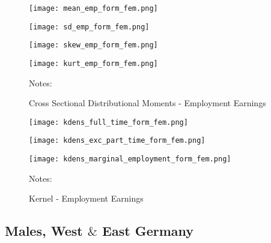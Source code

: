\documentclass[12pt, a4paper]{article}
\begin{document}
\begin{figure}[!h]
\captionsetup{font=large}
\caption{Cross Sectional Distributional Moments - Employment Earnings}
	\begin{minipage}[b]{0.48\textwidth} 
		\centering
		\texttt{[image: mean\_emp\_form\_fem.png]}
		\label{fig:mean_emp_form_fem}
	\end{minipage}
	\begin{minipage}[b]{0.48\textwidth}
		\centering
		\texttt{[image: sd\_emp\_form\_fem.png]}
		\label{fig:var_emp_form_fem}
	\end{minipage}
	\begin{minipage}[b]{0.48\textwidth} 
		\centering
		\texttt{[image: skew\_emp\_form\_fem.png]}
		\label{fig:skew_emp_form_fem}
	\end{minipage}
	\begin{minipage}[b]{0.48\textwidth}
		\centering
		\texttt{[image: kurt\_emp\_form\_fem.png]}
		\label{fig:kurt_emp_form_fem}
	\end{minipage}
\footnotesize{
\justifying Notes: \par} 
\end{figure}

\begin{figure}[!h]
\centering
\captionsetup{font=large}
\caption{Kernel - Employment Earnings}
	\begin{minipage}[b]{0.32\textwidth} 
		\centering
		\texttt{[image: kdens\_full\_time\_form\_fem.png]}
		\label{fig:kdens_full_time_form_fem}
	\end{minipage}
	\begin{minipage}[b]{0.32\textwidth}
		\centering
		\texttt{[image: kdens\_exc\_part\_time\_form\_fem.png]}
		\label{fig:kdens_exc_part_time_form_fem}
	\end{minipage}
	\begin{minipage}[b]{0.32\textwidth} 
		\centering
		\texttt{[image: kdens\_marginal\_employment\_form\_fem.png]}
		\label{fig:kdens_marginal_employment_form_fem}
	\end{minipage}
\footnotesize{
\justifying Notes: \par} 
\end{figure}

\clearpage
\subsection{Males, West $\&$ East Germany}
\end{document}
